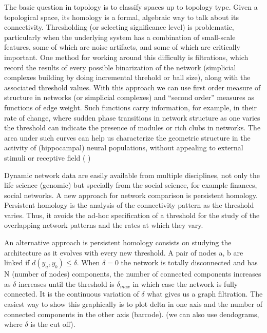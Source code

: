\documentclass[onecollarge,runningheads]{svjour2}
\begin{document}
The basic question in topology is to classify spaces up to topology type.
Given a topological space, its homology is a formal, algebraic way to talk about its connectivity.
Thresholding (or selecting significance level) is problematic, particularly when the underlying system has a combination of small-scale features, some of which are noise artifacts, and some of which are critically important.  %
One method for working around this difficulty is filtrations, which record the results of every possible binarization of the network (simplicial complexes building by doing incremental threhold or ball size), along with the associated threshold values. With this approach we can use first order measure of structure in networks (or simplicial complexes) and  “second order” measures as functions of edge weight. Such functions carry information, for example, in their rate of change, where sudden phase transitions in network structure as one varies the threshold can indicate the presence of modules or rich clubs in networks. The area under such curves can help us characterize the geometric structure in the activity of (hippocampal) neural populations, without appealing to external stimuli or receptive field ( \cite{giusti2015clique})

Dynamic network data are easily available from multiple disciplines, not only the life science (genomic) but specially from the social science, for example finances, social networks. A new approach for network comparison is persistent homology. Persistent homology is the analysis of the connectivity pattern as the threshold varies. Thus, it avoids the ad-hoc specification of a threshold for the study of the overlapping network patterns and the rates at which they vary.

An alternative approach is persistent homology consists on studying the architecture as it evolves with every new threshold.
A pair of nodes a, b are linked if $d(y_a, y_b) \leq \delta$. When $\delta = 0$ the network is totally disconnected and has N (number of nodes) components, the number of connected components increases as $\delta$ increases until the threshold is $\delta_{max}$ in which case the network is fully connected. It is the continuous variation of $\delta$ what gives us a graph filtration. The easiest way to show this graphically is to plot delta in one axis and the number of connected components in the other axis (barcode). (we can also use dendograms, where $\delta$ is the cut off). 
\end{document}
